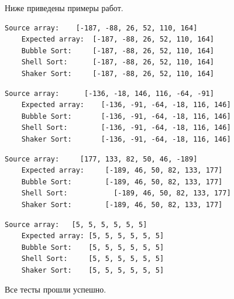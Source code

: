 \documentclass[a4paper]{article}
\begin{document}
	Ниже приведены примеры работ.
	
	\begin{lstlisting}[label = ex1, caption = Пример работы алгоритмов на сортированный массив]
	Source array:    [-187, -88, 26, 52, 110, 164]
	Expected array:  [-187, -88, 26, 52, 110, 164]
	Bubble Sort:     [-187, -88, 26, 52, 110, 164]
	Shell Sort:      [-187, -88, 26, 52, 110, 164]
	Shaker Sort:     [-187, -88, 26, 52, 110, 164]
	\end{lstlisting}
	
	
	
	\begin{lstlisting}[label = ex2, caption = Пример работы алгоритмов на случайный массив]
	Source array:      [-136, -18, 146, 116, -64, -91]
	Expected array:    [-136, -91, -64, -18, 116, 146]
	Bubble Sort:       [-136, -91, -64, -18, 116, 146]
	Shell Sort:        [-136, -91, -64, -18, 116, 146]
	Shaker Sort:       [-136, -91, -64, -18, 116, 146]
	\end{lstlisting}



	\begin{lstlisting}[label = ex3, caption = Пример работы алгоритмов на обратно отсортированный массив]
	Source array:  	  [177, 133, 82, 50, 46, -189]
	Expected array:  	[-189, 46, 50, 82, 133, 177]
	Bubble Sort:   		[-189, 46, 50, 82, 133, 177]
	Shell Sort:			  [-189, 46, 50, 82, 133, 177]
	Shaker Sort:  		[-189, 46, 50, 82, 133, 177]
	\end{lstlisting}


	
	\begin{lstlisting}[label = ex4, caption = Пример работы алгоритмов массив с одинаковыми элементами]
	Source array:   [5, 5, 5, 5, 5, 5]
	Expected array: [5, 5, 5, 5, 5, 5]
	Bubble Sort:    [5, 5, 5, 5, 5, 5]
	Shell Sort:     [5, 5, 5, 5, 5, 5]
	Shaker Sort:    [5, 5, 5, 5, 5, 5]
	\end{lstlisting}

	Все тесты прошли успешно.

	\clearpage
	
\end{document}
